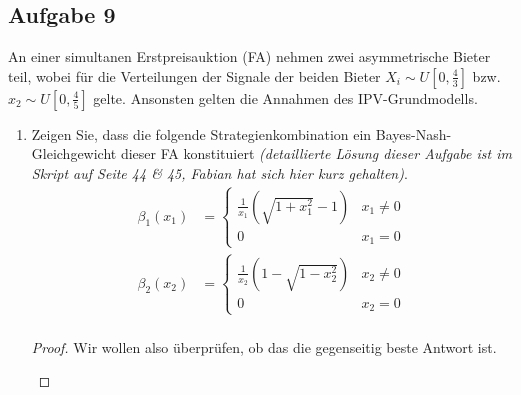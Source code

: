 \documentclass[12pt]{extreport} %
\theoremstyle{named}
\theoremstyle{nnamed}
\theoremstyle{itshape}
\theoremstyle{normal}
\begin{document}
\subsection*{Aufgabe 9}

An einer simultanen Erstpreisauktion (FA) nehmen zwei asymmetrische Bieter teil, wobei für die Verteilungen der Signale der beiden Bieter $X_{i} \sim U[0, \frac{4}{3}]$ bzw. $x_{2} \sim U[0, \frac{4}{5}]$ gelte. Ansonsten gelten die Annahmen des IPV-Grundmodells.

\begin{enumerate}
	\item Zeigen Sie, dass die folgende Strategienkombination ein Bayes-Nash-Gleichgewicht dieser FA konstituiert \textit{(detaillierte Lösung dieser Aufgabe ist im Skript auf Seite 44 \& 45, Fabian hat sich hier kurz gehalten)}.
		\begin{align*}
			\beta_{1}(x_{1}) & = \begin{cases} \frac{1}{x_{1}} \left( \sqrt{1+x_{1}^{2}} - 1 \right) & x_{1} \neq 0 \\ 0 & x_{1} = 0 \end{cases} \\
			\beta_{2}(x_{2}) & = \begin{cases} \frac{1}{x_{2}} \left( 1 - \sqrt{1-x_{2}^{2}}  \right) & x_{2} \neq 0 \\ 0 & x_{2} = 0 \end{cases} \\
		\end{align*}
		\begin{proof}
			Wir wollen also überprüfen, ob das die gegenseitig beste Antwort ist.
				\begin{figure*}[h] \centering
\end{figure*}
\end{proof}
\end{enumerate}
\end{document}
